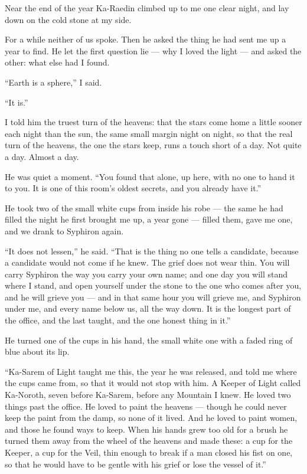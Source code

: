 Near the end of the year Ka-Raedin climbed up to me one clear night, and lay down on the cold stone at my side.

For a while neither of us spoke. Then he asked the thing he had sent me up a year to find. He let the first question lie --- why I loved the light --- and asked the other: what else had I found.\par

``Earth is a sphere,'' I said.

``It is.''

I told him the truest turn of the heavens: that the stars come home a little sooner each night than the sun, the same small margin night on night, so that the real turn of the heavens, the one the stars keep, runs a touch short of a day. Not quite a day. Almost a day.\par

He was quiet a moment. ``You found that alone, up here, with no one to hand it to you. It is one of this room's oldest secrets, and you already have it.''\par

He took two of the small white cups from inside his robe --- the same he had filled the night he first brought me up, a year gone --- filled them, gave me one, and we drank to Syphiron again. \par

``It does not lessen,'' he said. ``That is the thing no one tells a candidate, because a candidate would not come if he knew. The grief does not wear thin. You will carry Syphiron the way you carry your own name; and one day you will stand where I stand, and open yourself under the stone to the one who comes after you, and he will grieve you --- and in that same hour you will grieve me, and Syphiron under me, and every name below us, all the way down. It is the longest part of the office, and the last taught, and the one honest thing in it.''\par

He turned one of the cups in his hand, the small white one with a faded ring of blue about its lip.\par

``Ka-Sarem of Light taught me this, the year he was released, and told me where the cups came from, so that it would not stop with him. A Keeper of Light called Ka-Noroth, seven before Ka-Sarem, before any Mountain I knew. He loved two things past the office. He loved to paint the heavens --- though he could never keep the paint from the damp, so none of it lived. And he loved to paint women, and those he found ways to keep. When his hands grew too old for a brush he turned them away from the wheel of the heavens and made these: a cup for the Keeper, a cup for the Veil, thin enough to break if a man closed his fist on one, so that he would have to be gentle with his grief or lose the vessel of it.''\par

